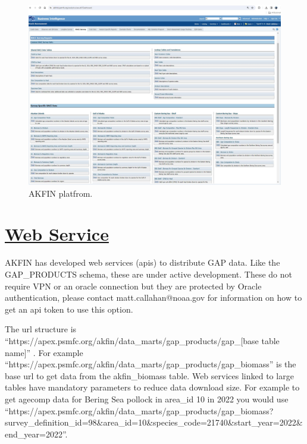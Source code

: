 \documentclass[
  letterpaper,
  oneside,
  open=any]{scrbook}
\begin{document}
\begin{figure}

{\centering \includegraphics[width=6.22in,height=\textheight]{content/../img/akfin.jpg}

}

\caption{AKFIN platfrom.}

\end{figure}

\hypertarget{web-service}{%
\section*{\texorpdfstring{\href{https://afsc-gap-products.github.io/gap_products/content/akfin-api-r.html}{Web
Service}}{Web Service}}\label{web-service}}


AKFIN has developed web services (apis) to distribute GAP data. Like the
GAP\_PRODUCTS schema, these are under active development. These do not
require VPN or an oracle connection but they are protected by Oracle
authentication, please contact matt.callahan@noaa.gov for information on
how to get an api token to use this option.

The url structure is
``https://apex.psmfc.org/akfin/data\_marts/gap\_products/gap\_{[}base
table name{]}'' . For example
``https://apex.psmfc.org/akfin/data\_marts/gap\_products/gap\_biomass''
is the base url to get data from the akfin\_biomass table. Web services
linked to large tables have mandatory parameters to reduce data download
size. For example to get agecomp data for Bering Sea pollock in area\_id
10 in 2022 you would use
``https://apex.psmfc.org/akfin/data\_marts/gap\_products/gap\_biomass?survey\_definition\_id=98\&area\_id=10\&species\_code=21740\&start\_year=2022\&end\_year=2022''.
\end{document}
